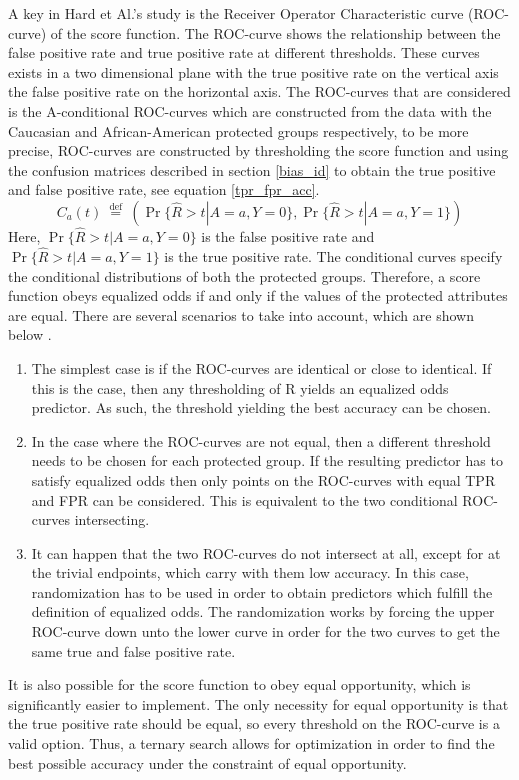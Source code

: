 \documentclass[11pt, fleqn, titlepage]{article}
\begin{document}
	A key in Hard et Al.'s study is the Receiver Operator Characteristic curve (ROC-curve) of the score function. The ROC-curve shows the relationship between the false positive rate and true positive rate at different thresholds. These curves exists in a two dimensional plane with the true positive rate on the vertical axis the false positive rate on the horizontal axis. The ROC-curves that are considered is the A-conditional ROC-curves which are constructed from the data with the Caucasian and African-American protected groups respectively, to be more precise, ROC-curves are constructed by thresholding the score function and using the confusion matrices described in section \ref{bias_id} to obtain the true positive and false positive rate, see equation \ref{tpr_fpr_acc}.
	\begin{equation*}\label{key}
	C_{a}(t) \stackrel{\text { def }}{=}(\operatorname{Pr}\{\widehat{R}>t | A=a, Y=0\}, \operatorname{Pr}\{\widehat{R}>t | A=a, Y=1\})
	\end{equation*}
	Here, $ \operatorname{Pr}\{\widehat{R}>t | A=a, Y=0\} $ is the false positive rate and $ \operatorname{Pr}\{\widehat{R}>t | A=a, Y=1\} $ is the true positive rate. The conditional curves specify the conditional distributions of both the protected groups. Therefore, a score function obeys equalized odds if and only if the values of the protected attributes are equal. There are several scenarios to take into account, which are shown below \cite{equal_of_oppor}.
	\begin{enumerate}
		\item The simplest case is if the ROC-curves are identical or close to identical. If this is the case, then any thresholding of R yields an equalized odds predictor. As such, the threshold yielding the best accuracy can be chosen.
		\item In the case where the ROC-curves are not equal, then a different threshold needs to be chosen for each protected group. If the resulting predictor has to satisfy equalized odds then only points on the ROC-curves with equal TPR and FPR can be considered. This is equivalent to the two conditional ROC-curves intersecting. 
		\item It can happen that the two ROC-curves do not intersect at all, except for at the trivial endpoints, which carry with them low accuracy. In this case, randomization has to be used in order to obtain predictors which fulfill the definition of equalized odds. The randomization works by forcing the upper ROC-curve down unto the lower curve in order for the two curves to get the same true and false positive rate.
	\end{enumerate}
	It is also possible for the score function to obey equal opportunity, which is significantly easier to implement. The only necessity for equal opportunity is that the true positive rate should be equal, so every threshold on the ROC-curve is a valid option. Thus, a ternary search allows for optimization in order to find the best possible accuracy under the constraint of equal opportunity.
	
\end{document}
